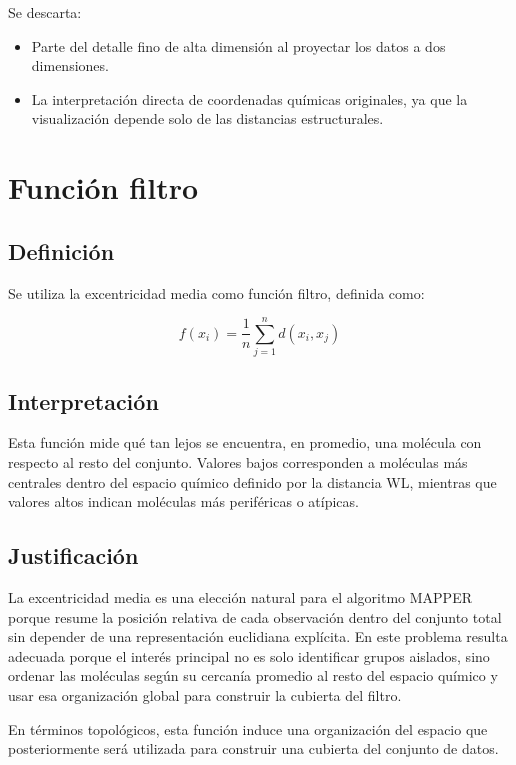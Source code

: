 \documentclass[12pt]{article}
\begin{document}
Se descarta:
\begin{itemize}
    \item Parte del detalle fino de alta dimensi\'on al proyectar los datos a dos dimensiones.
    \item La interpretaci\'on directa de coordenadas qu\'imicas originales, ya que la visualizaci\'on depende solo de las distancias estructurales.
\end{itemize}

\section{Funci\'on filtro}

\subsection{Definici\'on}

Se utiliza la excentricidad media como funci\'on filtro, definida como:

\[
f(x_i) = \frac{1}{n} \sum_{j=1}^{n} d(x_i, x_j)
\]

\subsection{Interpretaci\'on}

Esta funci\'on mide qu\'e tan lejos se encuentra, en promedio, una mol\'ecula con respecto al resto del conjunto. Valores bajos corresponden a mol\'eculas m\'as centrales dentro del espacio qu\'imico definido por la distancia WL, mientras que valores altos indican mol\'eculas m\'as perif\'ericas o at\'ipicas.

\subsection{Justificaci\'on}

La excentricidad media es una elecci\'on natural para el algoritmo MAPPER porque resume la posici\'on relativa de cada observaci\'on dentro del conjunto total sin depender de una representaci\'on euclidiana expl\'icita. En este problema resulta adecuada porque el inter\'es principal no es solo identificar grupos aislados, sino ordenar las mol\'eculas seg\'un su cercan\'ia promedio al resto del espacio qu\'imico y usar esa organizaci\'on global para construir la cubierta del filtro.

En términos topológicos, esta función induce una organización del espacio que posteriormente será utilizada para construir una cubierta del conjunto de datos.
\end{document}

